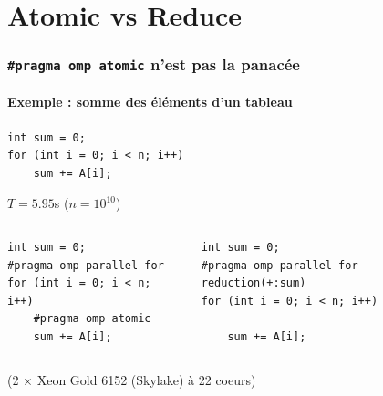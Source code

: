 \documentclass[xcolor={x11names,svgnames}]{beamer}
\begin{document}

\section{Atomic vs Reduce}


\begin{frame}[fragile]
  \frametitle{\texttt{\#pragma omp atomic} n'est pas la panacée}
  \framesubtitle{Exemple : somme des éléments d'un tableau}

\begin{verbatim}
int sum = 0;
for (int i = 0; i < n; i++)
    sum += A[i];
\end{verbatim}

      \bigskip
      
      \Large \alert{$T = 5.95$s} \qquad ($n = 10^{10}$)


      \vspace{1cm}
      
  \begin{columns}
    \begin{column}{0.4\textwidth}
\begin{verbatim}
int sum = 0;
#pragma omp parallel for
for (int i = 0; i < n; i++)
    #pragma omp atomic
    sum += A[i];
\end{verbatim}

      \bigskip
      
      
    \end{column}
    \begin{column}{0.6\textwidth}
\begin{verbatim}
int sum = 0;
#pragma omp parallel for reduction(+:sum)
for (int i = 0; i < n; i++)

    sum += A[i];
\end{verbatim}

      \bigskip
      
    \end{column}
  \end{columns}

\vspace{1cm}
  
\normalsize (2 $\times$ Xeon Gold 6152 (\og Skylake\fg{}) à 22 coeurs)
\end{frame}

\end{document}
